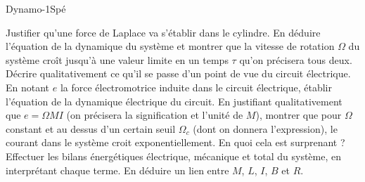 \begin{exercise}{Dynamo}{-1}{Spé}
\begin{questions}
\question Justifier qu'une force de Laplace va s'établir dans le cylindre. En déduire l'équation de la dynamique du système et montrer que la vitesse de rotation $\Omega$ du système croît jusqu'à une valeur limite en un temps $\tau$ qu'on précisera tous deux.
\question Décrire qualitativement ce qu'il se passe d'un point de vue du circuit électrique.
\question En notant $e$ la force électromotrice induite dans le circuit électrique, établir l'équation de la dynamique électrique du circuit.
\question En justifiant qualitativement que $e = \Omega M I$ (on précisera la signification et l'unité de $M$), montrer que pour $\Omega$ constant et au dessus d'un certain seuil $\Omega_c$ (dont on donnera l'expression), le courant dans le système croit exponentiellement. En quoi cela est surprenant ?
\question Effectuer les bilans énergétiques électrique, mécanique et total du système, en interprétant chaque terme.
\question En déduire un lien entre $M$, $L$, $I$, $B$ et $R$.
\end{questions}


\end{exercise}

